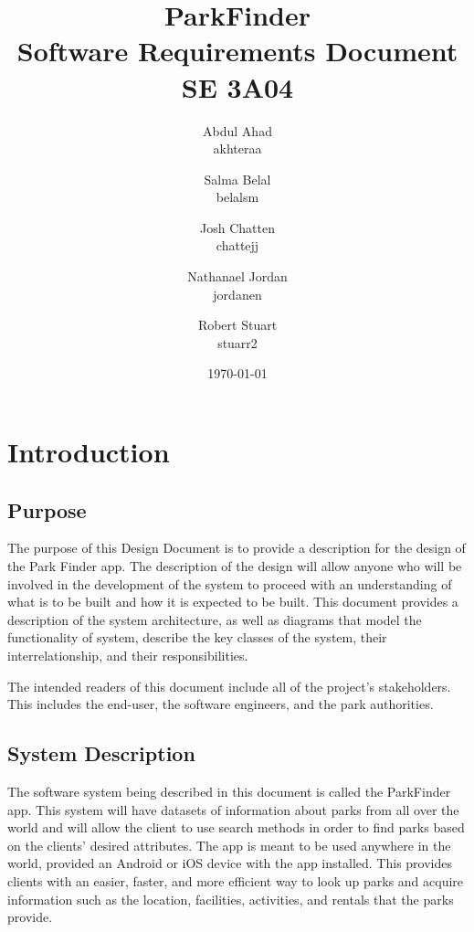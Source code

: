 \documentclass[titlepage,12pt]{article}
\title{ParkFinder\\Software Requirements Document\\SE 3A04}
\author{Abdul Ahad \\ akhteraa \and Salma Belal \\ belalsm \and Josh Chatten \\ chattejj \and
Nathanael Jordan \\ jordanen \and Robert Stuart \\ stuarr2}
\date{\today}
\begin{document}
\maketitle	
\thispagestyle{empty}
\clearpage
\setcounter{tocdepth}{2}%
\tableofcontents
\clearpage


\section{Introduction}
\label{sec:introduction}


\subsection{Purpose}
\label{sub:purpose}

The purpose of this Design Document is to provide a description for the design of the Park Finder
app. The description of the design will allow anyone who will be involved in the development of 
the system to proceed with an understanding of what is to be built and how it is expected to be built.
This document provides a description of the system architecture, as well as diagrams that model the
functionality of system, describe the key classes of the system, their interrelationship, and their
responsibilities.

The intended readers of this document include all of the project's stakeholders. This includes the
end-user, the software engineers, and the park authorities.


\subsection{System Description}
\label{sub:system_description}

The software system being described in this document is called the ParkFinder app. This system will
have datasets of information about parks from all over the world and will allow the client to use
search methods in order to find parks based on the clients' desired attributes. The app is meant to
be used anywhere in the world, provided an Android or iOS device with the app installed. This
provides clients with an easier, faster, and more efficient way to look up parks and acquire
information such as the location, facilities, activities, and rentals that the parks provide.
\end{document}
